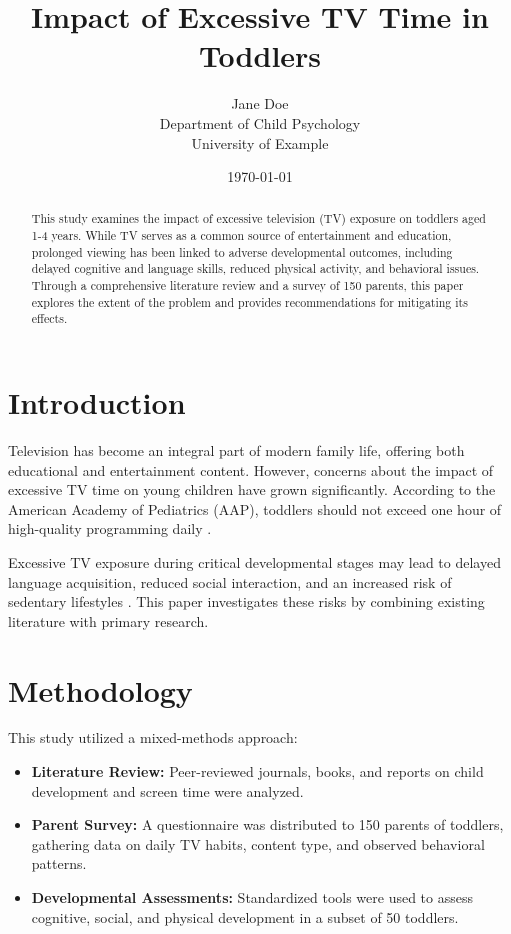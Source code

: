 \documentclass[a4paper,12pt]{article}
\title{\textbf{Impact of Excessive TV Time in Toddlers}}
\author{Jane Doe \\ Department of Child Psychology \\ University of Example}
\date{\today}
\begin{document}
\maketitle

\begin{abstract}
This study examines the impact of excessive television (TV) exposure on toddlers aged 1-4 years. While TV serves as a common source of entertainment and education, prolonged viewing has been linked to adverse developmental outcomes, including delayed cognitive and language skills, reduced physical activity, and behavioral issues. Through a comprehensive literature review and a survey of 150 parents, this paper explores the extent of the problem and provides recommendations for mitigating its effects.
\end{abstract}

\tableofcontents
\newpage

\section{Introduction}
Television has become an integral part of modern family life, offering both educational and entertainment content. However, concerns about the impact of excessive TV time on young children have grown significantly. According to the American Academy of Pediatrics (AAP), toddlers should not exceed one hour of high-quality programming daily \cite{aap_guidelines}.

Excessive TV exposure during critical developmental stages may lead to delayed language acquisition, reduced social interaction, and an increased risk of sedentary lifestyles \cite{screen_time_research}. This paper investigates these risks by combining existing literature with primary research.

\section{Methodology}
This study utilized a mixed-methods approach:
\begin{itemize}
    \item \textbf{Literature Review:} Peer-reviewed journals, books, and reports on child development and screen time were analyzed.
    \item \textbf{Parent Survey:} A questionnaire was distributed to 150 parents of toddlers, gathering data on daily TV habits, content type, and observed behavioral patterns.
    \item \textbf{Developmental Assessments:} Standardized tools were used to assess cognitive, social, and physical development in a subset of 50 toddlers.
\end{itemize}
\end{document}
